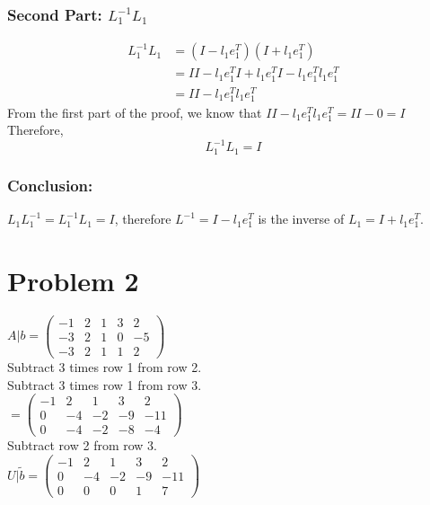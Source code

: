 \documentclass[fleqn]{article}
\begin{document}
\subsubsection*{Second Part: $L_1^{-1} L_1 $}
\begin{equation*}
    \begin{split}
        L_1^{-1} L_1 &= (I-l_1e_1^{T})(I+l_1 e_1^{T})\\
        &= II - l_1e_1^{T}I+l_1e_1^{T}I - l_1 e_1^{T}l_1 e_1^{T}\\
        &= II - l_1 e_1^{T}l_1 e_1^{T}
    \end{split}
\end{equation*}
From the first part of the proof, we know that $II - l_1 e_1^{T}l_1 e_1^{T} = II - 0 = I$
Therefore,
\begin{equation*}
        L_1^{-1} L_1 = I
\end{equation*}
\subsubsection*{Conclusion: }
$L_1 L_1^{-1} = L_1^{-1} L_1  = I$, therefore $L^{-1} = I-l_1 e_1^{T} $ is the inverse of 
$L_1=I+l_1e_1^{T}$.
\section*{Problem 2}
$A|b= \begin{pmatrix}-1&2&1&3&2\\-3&2&1&0&-5\\ -3&2&1&1&2\end{pmatrix}$\\
\linebreak
    \indent Subtract 3 times row 1 from row 2.\\
    \indent Subtract 3 times row 1 from row 3.\\
\linebreak
$= \begin{pmatrix}-1&2&1&3&2\\0&-4&-2&-9&-11\\ 0&-4&-2&-8&-4\end{pmatrix}$\\
\linebreak
    \indent Subtract row 2 from row 3.\\
\linebreak
$U| \widetilde{b}= \begin{pmatrix}-1&2&1&3&2\\0&-4&-2&-9&-11\\ 0&0&0&1&7\end{pmatrix}$\\
\end{document}
